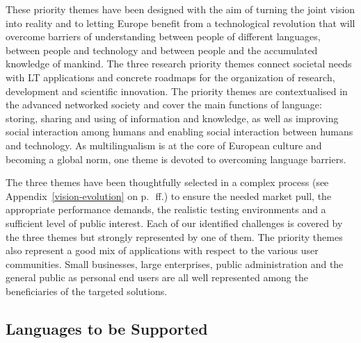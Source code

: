 \documentclass[10pt, plain]{../../metanetpaper}
\begin{document}
\begin{multicols}{2}
These priority themes have been designed with the aim of turning the joint vision into reality and to letting Europe benefit from a technological revolution that will overcome barriers of understanding between people of different languages, between people and technology and between people and the accumulated knowledge of mankind. The three research priority themes connect societal needs with LT applications and concrete roadmaps for the organization of research, development and scientiﬁc innovation. The priority themes are contextualised in the advanced networked society and cover the main functions of language: storing, sharing and using of information and knowledge, as well as improving social interaction among humans and enabling social interaction between humans and technology. As multilingualism is at the core of European culture and becoming a global norm, one theme is devoted to overcoming language barriers. 

The three themes have been thoughtfully selected in a complex process (see Appendix~\ref{vision-evolution} on p.~\pageref{vision-evolution}\,ff.) to ensure the needed market pull, the appropriate performance demands, the realistic testing environments and a sufficient level of public interest. Each of our identified challenges is covered by the three themes but strongly represented by one of them. The priority themes also represent a good mix of applications with respect to the various user communities. Small businesses, large enterprises, public administration and the general public as personal end users are all well represented among the beneficiaries of the targeted solutions.

\subsection{Languages to be Supported}
\label{sec:languages-to-be-supported}

%
%
% 


\end{multicols}
\end{document}
